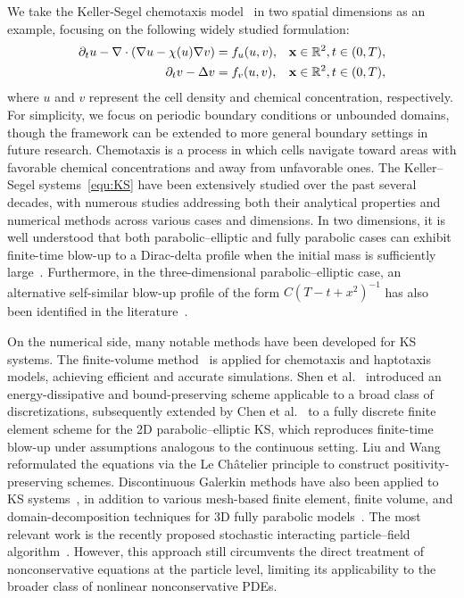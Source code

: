\documentclass[12pt]{article}
\begin{document}
We take the Keller-Segel chemotaxis model~\cite{keller1970initiation, patlak1953random} in two spatial dimensions as an example, focusing on the following widely studied formulation:
\begin{equation}\label{equ:KS}
\begin{aligned}
\partial_t u - \nabla \cdot ( \nabla u - \chi(u) \nabla v) &= f_u(u,v), & \mathbf{x}\in \mathbb{R}^2 , t\in(0,T), \\
\partial_t v - \Delta v &= f_v(u,v), & \mathbf{x}\in \mathbb{R}^2 , t\in(0,T),
\end{aligned}
\end{equation}
where $u$ and $v$ represent the cell density and chemical concentration, respectively. For simplicity, we focus on periodic boundary conditions or unbounded domains, though the framework can be extended to more general boundary settings in future research. Chemotaxis is a process in which cells navigate toward areas with favorable chemical concentrations and away from unfavorable ones. 
The Keller–Segel systems~\eqref{equ:KS} have been extensively studied over the past several decades, with numerous studies addressing both their analytical properties and numerical methods across various cases and dimensions. In two dimensions, it is well understood that both parabolic–elliptic and fully parabolic cases can exhibit finite-time blow-up to a Dirac-delta profile when the initial mass is sufficiently large~\cite{herrero1997blow, perthame2007transport}. Furthermore, in the three-dimensional parabolic–elliptic case, an alternative self-similar blow-up profile of the form $ C(T-t+x^2)^{-1}$ has also been identified in the literature~\cite{giga2011asymptotic,souplet2019blow}. 

On the numerical side, many notable methods have been developed for KS systems. The finite-volume method~\cite{filbet2006finite,chertock2008second} is applied for chemotaxis and haptotaxis models, achieving efficient and accurate simulations. Shen et al.~\cite{shen2020unconditionally} introduced an energy-dissipative and bound-preserving scheme applicable to a broad class of discretizations, subsequently extended by Chen et al.~\cite{chen2022error} to a fully discrete finite element scheme for the 2D parabolic–elliptic KS, which reproduces finite-time blow-up under assumptions analogous to the continuous setting. Liu and Wang~\cite{liu2018positivity} reformulated the equations via the Le Ch\^atelier principle to construct positivity-preserving schemes. Discontinuous Galerkin methods have also been applied to KS systems~\cite{zhong2024direct, li2017local,epshteyn2009new}, in addition to various mesh-based finite element, finite volume, and domain-decomposition techniques for 3D fully parabolic models~\cite{epshteyn2019efficient, strehl2013positivity}. The most relevant work is the recently proposed stochastic interacting particle–field algorithm~\cite{wang2025novel,hu2024stochastic}. However, this approach still circumvents the direct treatment of nonconservative equations at the particle level, limiting its applicability to the broader class of nonlinear nonconservative PDEs.
\end{document}
